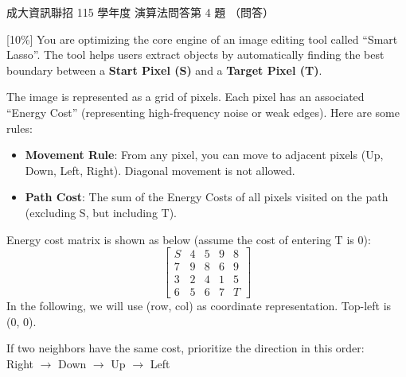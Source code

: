 \begin{pastexam}[label={px:ncku-115-prog-17}]{成大資訊聯招 115 學年度 演算法問答第 4 題}
（問答）

[10\%] You are optimizing the core engine of an image editing tool called ``Smart Lasso''. The tool helps
users extract objects by automatically finding the best boundary between a \textbf{Start Pixel (S)} and a
\textbf{Target Pixel (T)}.

The image is represented as a grid of pixels. Each pixel has an associated ``Energy Cost'' (representing
high-frequency noise or weak edges). Here are some rules:
\begin{itemize}[label=$\blacksquare$]
\item \textbf{Movement Rule}: From any pixel, you can move to adjacent pixels (Up, Down, Left, Right).
Diagonal movement is not allowed.
\item \textbf{Path Cost}: The sum of the Energy Costs of all pixels visited on the path (excluding S, but
including T).
\end{itemize}
Energy cost matrix is shown as below (assume the cost of entering T is 0):
\[
\begin{bmatrix}
S & 4 & 5 & 9 & 8\\
7 & 9 & 8 & 6 & 9\\
3 & 2 & 4 & 1 & 5\\
6 & 5 & 6 & 7 & T
\end{bmatrix}
\]
In the following, we will use (row, col) as coordinate representation. Top-left is (0, 0).

If two neighbors have the same cost, prioritize the direction in this order:\\
Right $\to$ Down $\to$ Up $\to$ Left


\end{pastexam}
